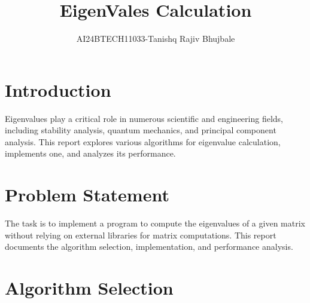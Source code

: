 \documentclass[journal]{IEEEtran}
\begin{document}

\vspace{3cm}
\title{EigenVales Calculation}
\author{AI24BTECH11033-Tanishq Rajiv Bhujbale}
\maketitle
\bigskip

\renewcommand{\thefigure}{\theenumi}
\renewcommand{\thetable}{\theenumi}

\maketitle
\tableofcontents
\newpage

\section{Introduction}
Eigenvalues play a critical role in numerous scientific and engineering fields, including stability analysis, quantum mechanics, and principal component analysis. This report explores various algorithms for eigenvalue calculation, implements one, and analyzes its performance.



\section{Problem Statement}
The task is to implement a program to compute the eigenvalues of a given matrix without relying on external libraries for matrix computations. This report documents the algorithm selection, implementation, and performance analysis.

\section{Algorithm Selection}
\end{document}
